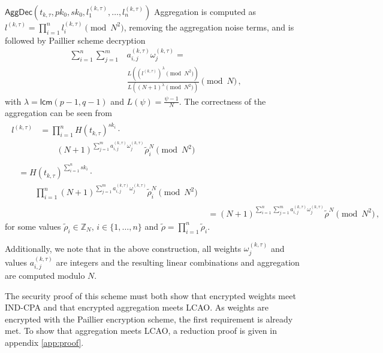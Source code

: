 \documentclass[10pt,letterpaper,oneside,twocolumn,journal]{IEEEtran}
\theoremstyle{definition}
\theoremstyle{definition}
\theoremstyle{remark}
\begin{document}
\begin{LaTeXdescription}
    \item[$\mathsf{AggDec}(t_{k,\tau}, pk_0, sk_0, l^{(k,\tau)}_1,\dots,l^{(k,\tau)}_n)$] Aggregation is computed as $l^{(k,\tau)} = \prod^n_{i=1}l^{(k,\tau)}_i \pmod{N^2}$, removing the aggregation noise terms, and is followed by Paillier scheme decryption
    \begin{equation}
        \begin{split}
            \sum^{n}_{i=1}\sum^{m}_{j=1}&a^{(k,\tau)}_{i,j}\omega^{(k,\tau)}_j =\\
            &\frac{L((l^{(k,\tau)})^\lambda\pmod{N^2})}{L((N+1)^\lambda\pmod{N^2})} \pmod{N}\,,
        \end{split} \label{eqn:our_scheme_decrypt}
    \end{equation}
    with $\lambda = \mathsf{lcm}(p-1, q-1)$ and $L(\psi) = \frac{\psi-1}{N}$. The correctness of the aggregation can be seen from
    \begin{align*}
        \begin{split}
        l^{(k,\tau)} &= \prod^n_{i=1}H(t_{k,\tau})^{sk_i}\cdot \\
        &\qquad (N+1)^{\sum^{m}_{j=1}a^{(k,\tau)}_{i,j}\omega^{(k,\tau)}_j}\tilde{\rho}_i^N \!\!\pmod{N^2}
        \end{split}\\
        \begin{split}
            &= H(t_{k,\tau})^{\sum^n_{i=1}sk_i}\cdot \\
            &\qquad \prod^n_{i=1}(N+1)^{\sum^{m}_{j=1}a^{(k,\tau)}_{i,j}\omega^{(k,\tau)}_j}\tilde{\rho}_i^N \!\!\pmod{N^2}
        \end{split}\\
        &= (N+1)^{\sum^n_{i=1}\sum^{m}_{j=1}a^{(k,\tau)}_{i,j}\omega^{(k,\tau)}_j}\tilde{\rho}^N \!\!\pmod{N^2}\,,
    \end{align*}
    for some values $\tilde{\rho}_i \in \mathbb{Z}_N,\,i\in\{1,\dots,n\}$ and $\tilde{\rho}=\prod^{n}_{i=1}\tilde{\rho}_i$.
\end{LaTeXdescription}
Additionally, we note that in the above construction, all weights $\omega^{(k,\tau)}_j$ and values $a^{(k,\tau)}_{i,j}$ are integers and the resulting linear combinations and aggregation are computed modulo $N$. 

The security proof of this scheme must both show that encrypted weights meet IND-CPA and that encrypted aggregation meets LCAO. As weights are encrypted with the Paillier encryption scheme, the first requirement is already met. To show that aggregation meets LCAO, a reduction proof is given in appendix \ref{app:proof}.
\end{document}
